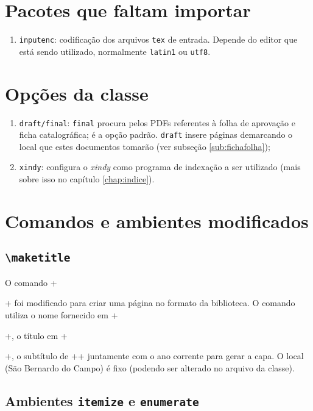 \documentclass[xindy,draft]{fei}
\begin{document}
\section{Pacotes que faltam importar}

    \begin{enumerate}
        \item\texttt{inputenc}: codificação dos arquivos \texttt{tex} de entrada. Depende do editor que está sendo utilizado, normalmente \texttt{latin1} ou \texttt{utf8}.
    \end{enumerate}
    
\section{Opções da classe}
	\begin{enumerate}
	\item \texttt{draft/final}: \texttt{final} procura pelos PDFs referentes à folha de aprovação e ficha catalográfica; é a opção padrão. \texttt{draft} insere páginas demarcando o local que estes documentos tomarão (ver subseção \ref{sub:fichafolha});
	\item \texttt{xindy}: configura o \emph{xindy} como programa de indexação a ser utilizado (mais sobre isso no capítulo \ref{chap:indice}).
	\end{enumerate}

\section{Comandos e ambientes modificados}
    
    \subsection{\texttt{\textbackslash maketitle}}
    
    O comando \latexinline+\maketitle+ foi modificado para criar uma página no formato da biblioteca. O comando utiliza o nome fornecido em \latexinline+\author{}+, o título em \latexinline+\title{}+, o subtítulo de \latexinline+\subtitulo{}+ juntamente com o ano corrente para gerar a capa. O local (São Bernardo do Campo) é fixo (podendo ser alterado no arquivo da classe).

    \subsection{Ambientes \texttt{itemize} e \texttt{enumerate}}
    
\end{document}
